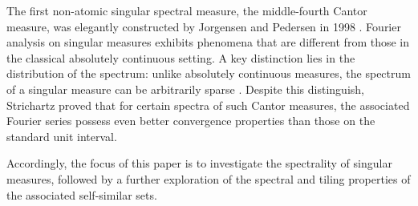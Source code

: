 \documentclass[11pt]{article}
\numberwithin{equation}{section}
\begin{document}
The first non-atomic singular spectral measure, the middle-fourth Cantor measure, was elegantly constructed by Jorgensen and Pedersen in 1998 \cite{Jorgensen-Pedersen_1998}. Fourier analysis on singular measures exhibits phenomena that are different from those in the classical absolutely continuous setting. A key distinction lies in the distribution of the spectrum: unlike absolutely continuous measures, the spectrum of a singular measure can be arbitrarily sparse \cite{AL_2023}. Despite this distinguish, Strichartz \cite{Strichartz_2000,Strichartz_2006} proved that for certain spectra of such Cantor measures, the associated Fourier series possess even better convergence properties than those on the standard unit interval.

Accordingly, the focus of this paper is to investigate the spectrality of singular measures, followed by a further exploration of the spectral and tiling properties of the associated self-similar sets.
\end{document}
